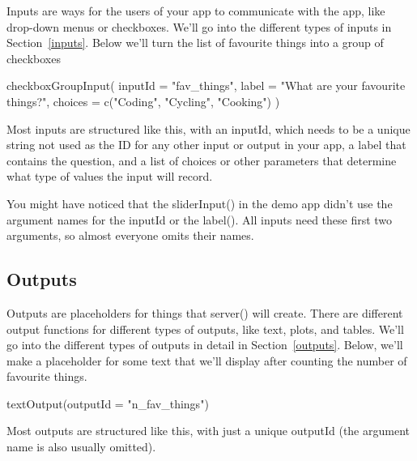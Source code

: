 \documentclass[
]{book}
\newenvironment{Shaded}{\begin{snugshade}}{\end{snugshade}}
\newcommand{\AttributeTok}[1]{\textcolor[rgb]{0.77,0.63,0.00}{#1}}
\newcommand{\FunctionTok}[1]{\textcolor[rgb]{0.00,0.00,0.00}{#1}}
\newcommand{\NormalTok}[1]{#1}
\newcommand{\StringTok}[1]{\textcolor[rgb]{0.31,0.60,0.02}{#1}}
\begin{document}
Inputs are ways for the users of your app to communicate with the app, like drop-down menus or checkboxes. We'll go into the different types of inputs in Section~\ref{inputs}. Below we'll turn the list of favourite things into a group of checkboxes

\begin{Shaded}
\begin{Highlighting}[]
\FunctionTok{checkboxGroupInput}\NormalTok{(}
  \AttributeTok{inputId =} \StringTok{"fav\_things"}\NormalTok{,}
  \AttributeTok{label =} \StringTok{"What are your favourite things?"}\NormalTok{,}
  \AttributeTok{choices =} \FunctionTok{c}\NormalTok{(}\StringTok{"Coding"}\NormalTok{, }\StringTok{"Cycling"}\NormalTok{, }\StringTok{"Cooking"}\NormalTok{)}
\NormalTok{)}
\end{Highlighting}
\end{Shaded}

Most inputs are structured like this, with an inputId, which needs to be a unique string not used as the ID for any other input or output in your app, a label that contains the question, and a list of choices or other parameters that determine what type of values the input will record.

You might have noticed that the sliderInput() in the demo app didn't use the argument names for the inputId or the label(). All inputs need these first two arguments, so almost everyone omits their names.

\hypertarget{outputs-intro}{%
\subsection{Outputs}\label{outputs-intro}}

Outputs are placeholders for things that server() will create. There are different output functions for different types of outputs, like text, plots, and tables. We'll go into the different types of outputs in detail in Section~\ref{outputs}. Below, we'll make a placeholder for some text that we'll display after counting the number of favourite things.

\begin{Shaded}
\begin{Highlighting}[]
\FunctionTok{textOutput}\NormalTok{(}\AttributeTok{outputId =} \StringTok{"n\_fav\_things"}\NormalTok{)}
\end{Highlighting}
\end{Shaded}

Most outputs are structured like this, with just a unique outputId (the argument name is also usually omitted).
\end{document}
